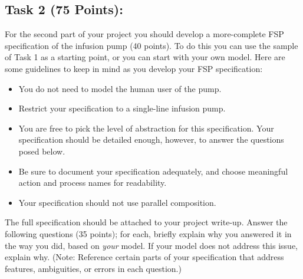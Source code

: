 ﻿\documentclass{article}
\newcommand{\head}{\subsection*}
\begin{document}
\head{Task 2 (75 Points):}


For the second part of your project you should develop a
more-complete FSP specification of the infusion pump (40 points). To
do this you can use the sample of Task 1 as a starting point, or you
can start with your own model. Here are some guidelines to keep in
mind as you develop your FSP specification:


\begin{itemize}
\item You do not need to model the human user of the pump.


\item Restrict your specification to a single-line infusion pump.


\item You are free to pick the level of abstraction for this specification. Your specification
should be detailed enough, however, to answer the questions posed below.


\item Be sure to document your specification adequately, and choose meaningful action and process names for readability.


\item Your specification should not use parallel composition.


\end{itemize}


\noindent The full specification should be attached to your project
write-up. Answer the following questions (35 points); for each,
briefly explain why you answered it in the way you did, based on
\emph{your} model. If your model does not address this issue,
explain why. (Note: Reference certain parts of your specification that address features, ambiguities, or errors in each question.)
\end{document}
